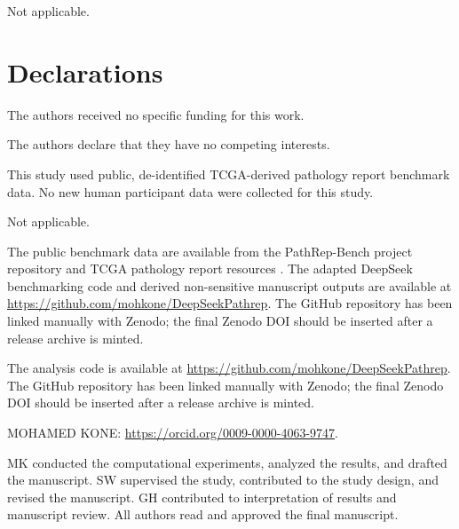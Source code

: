 \documentclass[pdflatex,sn-vancouver-num]{sn-jnl}
\begin{document}

Not applicable.

\section*{Declarations}


The authors received no specific funding for this work.


The authors declare that they have no competing interests.


This study used public, de-identified TCGA-derived pathology report benchmark data. No new human participant data were collected for this study.


Not applicable.


The public benchmark data are available from the PathRep-Bench project repository and TCGA pathology report resources \cite{pathrepbench,rosenthaldataset}. The adapted DeepSeek benchmarking code and derived non-sensitive manuscript outputs are available at \url{https://github.com/mohkone/DeepSeekPathrep}. The GitHub repository has been linked manually with Zenodo; the final Zenodo DOI should be inserted after a release archive is minted.


The analysis code is available at \url{https://github.com/mohkone/DeepSeekPathrep}. The GitHub repository has been linked manually with Zenodo; the final Zenodo DOI should be inserted after a release archive is minted.


MOHAMED KONE: \url{https://orcid.org/0009-0000-4063-9747}.


MK conducted the computational experiments, analyzed the results, and drafted the manuscript. SW supervised the study, contributed to the study design, and revised the manuscript. GH contributed to interpretation of results and manuscript review. All authors read and approved the final manuscript.


\end{document}
